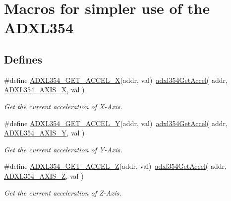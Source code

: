 \hypertarget{group___a_d_x_l354___m_a_c_r_o_s}{\section{\-Macros for simpler use of the \-A\-D\-X\-L354}
\label{group___a_d_x_l354___m_a_c_r_o_s}
}
\subsection*{\-Defines}
\begin{DoxyCompactItemize}
\item 
\hypertarget{group___a_d_x_l354___m_a_c_r_o_s_ga24da6f6c7f1c2a39de687738ea4bffd0}{\#define \hyperlink{group___a_d_x_l354___m_a_c_r_o_s_ga24da6f6c7f1c2a39de687738ea4bffd0}{\-A\-D\-X\-L354\-\_\-\-G\-E\-T\-\_\-\-A\-C\-C\-E\-L\-\_\-\-X}(addr, val)~\hyperlink{adxl354_8h_af02570dcd1ca6acd197193ee843ddee3}{adxl354\-Get\-Accel}( addr, \hyperlink{group___a_d_x_l354___a_x_i_s_gaa6b505b3acdf0fd830c97050220e03ef}{\-A\-D\-X\-L354\-\_\-\-A\-X\-I\-S\-\_\-\-X}, val )}\label{group___a_d_x_l354___m_a_c_r_o_s_ga24da6f6c7f1c2a39de687738ea4bffd0}

\begin{DoxyCompactList}\small\item\em \-Get the current acceleration of \-X-\/\-Axis. \end{DoxyCompactList}\item 
\hypertarget{group___a_d_x_l354___m_a_c_r_o_s_ga96cba403489b243b0ed531fc85004772}{\#define \hyperlink{group___a_d_x_l354___m_a_c_r_o_s_ga96cba403489b243b0ed531fc85004772}{\-A\-D\-X\-L354\-\_\-\-G\-E\-T\-\_\-\-A\-C\-C\-E\-L\-\_\-\-Y}(addr, val)~\hyperlink{adxl354_8h_af02570dcd1ca6acd197193ee843ddee3}{adxl354\-Get\-Accel}( addr, \hyperlink{group___a_d_x_l354___a_x_i_s_ga110e1234898b51eccbcec4ff024e546e}{\-A\-D\-X\-L354\-\_\-\-A\-X\-I\-S\-\_\-\-Y}, val )}\label{group___a_d_x_l354___m_a_c_r_o_s_ga96cba403489b243b0ed531fc85004772}

\begin{DoxyCompactList}\small\item\em \-Get the current acceleration of \-Y-\/\-Axis. \end{DoxyCompactList}\item 
\hypertarget{group___a_d_x_l354___m_a_c_r_o_s_ga982ac0c68b6a4b828d1d73687e96fa89}{\#define \hyperlink{group___a_d_x_l354___m_a_c_r_o_s_ga982ac0c68b6a4b828d1d73687e96fa89}{\-A\-D\-X\-L354\-\_\-\-G\-E\-T\-\_\-\-A\-C\-C\-E\-L\-\_\-\-Z}(addr, val)~\hyperlink{adxl354_8h_af02570dcd1ca6acd197193ee843ddee3}{adxl354\-Get\-Accel}( addr, \hyperlink{group___a_d_x_l354___a_x_i_s_ga30d308af2964af6d41132580f6f87b4c}{\-A\-D\-X\-L354\-\_\-\-A\-X\-I\-S\-\_\-\-Z}, val )}\label{group___a_d_x_l354___m_a_c_r_o_s_ga982ac0c68b6a4b828d1d73687e96fa89}

\begin{DoxyCompactList}\small\item\em \-Get the current acceleration of \-Z-\/\-Axis. \end{DoxyCompactList}\end{DoxyCompactItemize}
